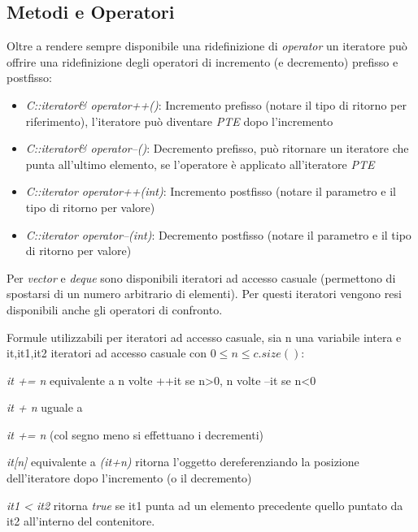 \subsection{Metodi e Operatori}
Oltre a rendere sempre disponibile una ridefinizione di \textit{operator\textasteriskcentered} un iteratore può offrire una ridefinizione degli operatori di incremento (e decremento) prefisso e postfisso:

\begin{itemize}
	\item \textit{C::iterator\& operator++()}: Incremento prefisso (notare il tipo di ritorno per riferimento), l'iteratore può diventare \textit{PTE} dopo l'incremento
	\item \textit{C::iterator\& operator--()}: Decremento prefisso, può ritornare un iteratore che punta all'ultimo elemento, se l'operatore è applicato all'iteratore \textit{PTE}
	\item \textit{C::iterator operator++(int)}: Incremento postfisso (notare il parametro e il tipo di ritorno per valore)
	\item \textit{C::iterator operator--(int)}: Decremento postfisso (notare il parametro e il tipo di ritorno per valore)
\end{itemize}

Per \textit{vector} e \textit{deque} sono disponibili iteratori ad accesso casuale (permettono di spostarsi di un numero arbitrario di elementi). Per questi iteratori vengono resi disponibili anche gli operatori di confronto.

Formule utilizzabili per iteratori ad accesso casuale, sia n una variabile intera e it,it1,it2 iteratori ad accesso casuale con $ 0\leq n \leq c.size() $:

\begin{description}
	\item \textit{it += n} equivalente a n volte ++it se n>0, n volte --it se n<0
	\item \textit{it + n} uguale a \item \textit{it += n} (col segno meno si effettuano i decrementi)
	\item \textit{it[n]} equivalente a \textit{\textasteriskcentered(it+n)} ritorna l'oggetto dereferenziando la posizione dell'iteratore dopo l'incremento (o il decremento)
	\item \textit{it1 < it2} ritorna \textit{true} se it1 punta ad un elemento precedente quello puntato da it2 all'interno del contenitore.
\end{description}

